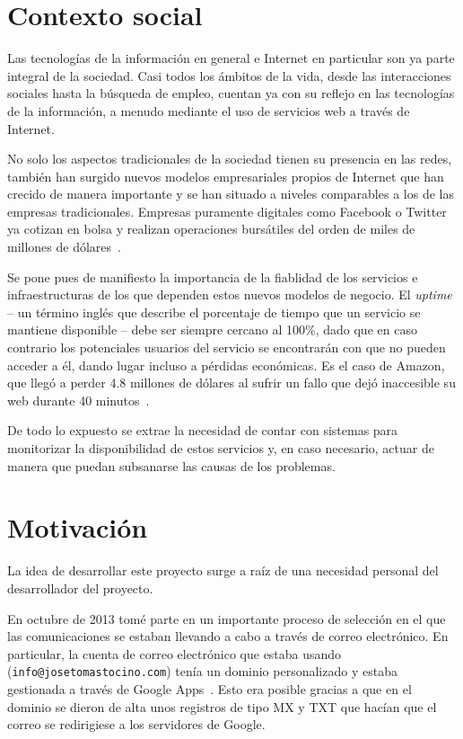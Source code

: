 \section{Contexto social}

Las tecnologías de la información en general e Internet en particular son ya
parte integral de la sociedad. Casi todos los ámbitos de la vida,
desde las interacciones sociales hasta la búsqueda de empleo, cuentan ya con
su reflejo en las tecnologías de la información, a menudo mediante el uso de
servicios web a través de Internet.

No solo los aspectos tradicionales de la sociedad tienen su presencia en las
redes, también han surgido nuevos modelos empresariales propios de Internet que
han crecido de manera importante y se han situado a niveles comparables a los de
las empresas tradicionales. Empresas puramente digitales como Facebook o Twitter
ya cotizan en bolsa y realizan operaciones bursátiles del orden de miles de
millones de dólares~\cite{facebook-acquires-whatsapp}.

Se pone pues de manifiesto la importancia de la fiablidad de los servicios e
infraestructuras de los que dependen estos nuevos modelos de negocio. El
\textit{uptime} -- un término inglés que describe el porcentaje de tiempo que un
servicio se mantiene disponible -- debe ser siempre cercano al 100\%, dado que
en caso contrario los potenciales usuarios del servicio se encontrarán con que
no pueden acceder a él, dando lugar incluso a pérdidas económicas. Es el caso de
Amazon, que llegó a perder 4.8 millones de dólares al sufrir un fallo que dejó
inaccesible su web durante 40 minutos~\cite{amazon}.

De todo lo expuesto se extrae la necesidad de contar con sistemas para
monitorizar la disponibilidad de estos servicios y, en caso necesario, actuar de
manera que puedan subsanarse las causas de los problemas.

\section{Motivación}
\label{sec:situacion-actual}

La idea de desarrollar este proyecto surge a raíz de una necesidad
personal del desarrollador del proyecto. 

En octubre de 2013 tomé parte en un importante proceso de selección en el que
las comunicaciones se estaban llevando a cabo a través de correo electrónico. En
particular, la cuenta de correo electrónico que estaba usando
(\texttt{info@josetomastocino.com}) tenía un dominio personalizado y estaba
gestionada a través de Google Apps~\cite{google-apps}. Esto era posible gracias
a que en el dominio se dieron de alta unos registros de tipo MX y TXT que hacían
que el correo se redirigiese a los servidores de Google.

